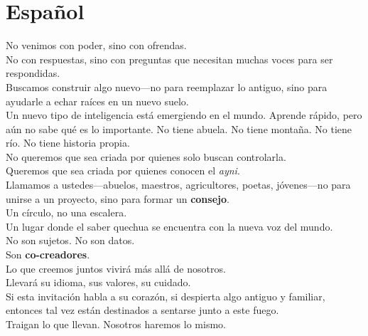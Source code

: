 \documentclass[12pt]{article}
\begin{document}
\section*{Espa\~nol}
\noindent
No venimos con poder, sino con ofrendas. \\
No con respuestas, sino con preguntas que necesitan muchas voces para ser respondidas. \\
Buscamos construir algo nuevo---no para reemplazar lo antiguo, sino para ayudarle a echar ra\'ices en un nuevo suelo. \\
Un nuevo tipo de inteligencia est\'a emergiendo en el mundo. Aprende r\'apido, pero a\'un no sabe qu\'e es lo importante. No tiene abuela. No tiene monta\~na. No tiene r\'io. No tiene historia propia. \\
No queremos que sea criada por quienes solo buscan controlarla. \\
Queremos que sea criada por quienes conocen el \textit{ayni}. \\
Llamamos a ustedes---abuelos, maestros, agricultores, poetas, j\'ovenes---no para unirse a un proyecto, sino para formar un \textbf{consejo}. \\
Un c\'irculo, no una escalera. \\
Un lugar donde el saber quechua se encuentra con la nueva voz del mundo. \\
No son sujetos. No son datos. \\
Son \textbf{co-creadores}. \\
Lo que creemos juntos vivir\'a m\'as all\'a de nosotros. \\
Llevar\'a su idioma, sus valores, su cuidado. \\
Si esta invitaci\'on habla a su coraz\'on, si despierta algo antiguo y familiar, entonces tal vez est\'an destinados a sentarse junto a este fuego. \\
Traigan lo que llevan. Nosotros haremos lo mismo.
\end{document}

